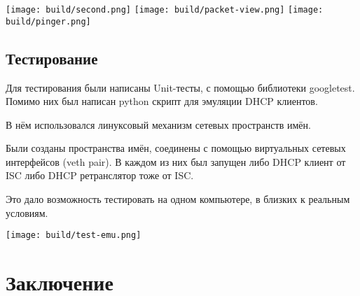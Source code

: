 \documentclass[12pt]{article}
\begin{document}
\texttt{[image: build/second.png]}
\texttt{[image: build/packet-view.png]}
\texttt{[image: build/pinger.png]}

\pagebreak
\subsection{Тестирование}

Для тестирования были написаны Unit-тесты, с помощью библиотеки googletest.
Помимо них был написан python скрипт для эмуляции DHCP клиентов.

В нём использовался линуксовый механизм сетевых пространств имён.

Были созданы пространства имён, соединены с помощью виртуальных сетевых интерфейсов (veth pair). В каждом из них был запущен либо DHCP клиент от ISC либо DHCP ретранслятор тоже от ISC.

Это дало возможность тестировать на одном компьютере, в близких к реальным условиям.

\texttt{[image: build/test-emu.png]}

\pagebreak
\section{Заключение}
\end{document}
